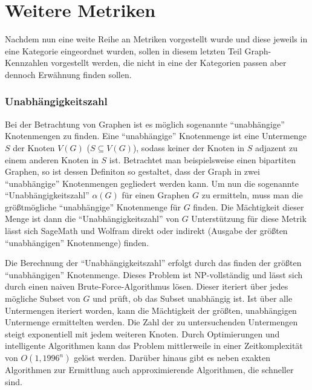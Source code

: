 \documentclass[a4paper,12pt,ngerman,chapterprefix=false,listof=totoc,bibliography=totoc]{scrreprt}
\begin{document}
\section{Weitere Metriken}
{
Nachdem nun eine weite Reihe an Metriken vorgestellt wurde und diese jeweils in eine Kategorie eingeordnet wurden, sollen in diesem letzten Teil Graph-Kennzahlen vorgestellt werden, die nicht in eine der Kategorien passen aber dennoch Erwähnung finden sollen.
\subsubsection*{Unabhängigkeitszahl}
{
Bei der Betrachtung von Graphen ist es möglich sogenannte "`unabhängige"' Knotenmengen zu finden. Eine "`unabhängige"' Knotenmenge ist eine Untermenge \(S\) der Knoten \(V(G)\) (\(S\subseteq V(G)\)), sodass keiner der Knoten in \(S\) adjazent zu einem anderen Knoten in \(S\) ist. Betrachtet man beispielsweise einen bipartiten Graphen, so ist dessen Definiton so gestaltet, dass der Graph in zwei "`unabhängige"' Knotenmengen gegliedert werden kann. Um nun die sogenannte "`Unabhängigkeitszahl"' \(\alpha(G)\) für einen Graphen \(G\) zu ermitteln, muss man die größtmögliche "`unabhängige"' Knotenmenge für \(G\) finden. Die Mächtigkeit dieser Menge ist dann die "`Unabhängigkeitszahl"' von \(G\) \cite{diestel_graphentheorie_2000,weisstein_maximum_nodate,weisstein_maximum_nodate} Unterstützung für diese Metrik lässt sich SageMath und Wolfram direkt oder indirekt (Ausgabe der größten "`unabhängigen"' Knotenmenge) finden. \cite{sagemath_graph_2020,weisstein_independence_nodate}

Die Berechnung der "`Unabhängigkeitszahl"' erfolgt durch das finden der größten "`unabhängigen"' Knotenmenge. Dieses Problem ist NP-vollständig und lässt sich durch einen naiven Brute-Force-Algorithmus lösen. Dieser iteriert über jedes mögliche Subset von \(G\) und prüft, ob das Subset unabhängig ist. Ist über alle Untermengen iteriert worden, kann die Mächtigkeit der größten, unabhängigen Untermenge ermittelten werden. Die Zahl der zu untersuchenden Untermengen steigt exponentiell mit jedem weiteren Knoten. Durch Optimierungen und intelligente Algorithmen kann das Problem mittlerweile in einer Zeitkomplexität von \(O(1,1996^n)\) gelöst werden. Darüber hinaus gibt es neben exakten Algorithmen zur Ermittlung auch approximierende Algorithmen, die schneller sind. \cite{xiao_exact_2017}
}
}
\end{document}
